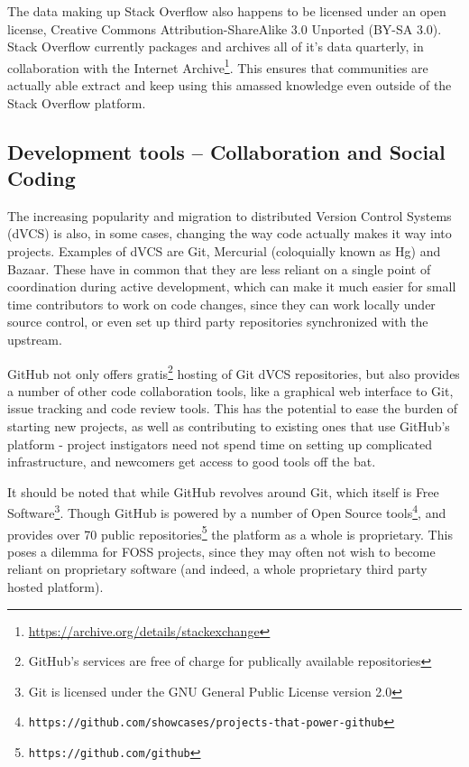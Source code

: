 \documentclass[a4paper,11pt]{article} %
\begin{document}
The data making up Stack Overflow also happens to be licensed under an open
license, Creative Commons Attribution-ShareAlike 3.0 Unported (BY-SA
3.0). Stack Overflow currently packages and archives all of it's data
quarterly, in collaboration with the Internet
Archive\footnote{\url{https://archive.org/details/stackexchange}}. This
ensures that communities are actually able extract and keep using this
amassed knowledge even outside of the Stack Overflow platform.


\subsection{Development tools -- Collaboration and Social Coding}

The increasing popularity and migration to distributed Version Control
Systems (dVCS) is also, in some cases, changing the way code actually makes
it way into projects. Examples of dVCS are Git, Mercurial (coloquially known
as Hg) and Bazaar. These have in common that they are less reliant on a
single point of coordination during active development, which can make it
much easier for small time contributors to work on code changes, since they
can work locally under source control, or even set up third party
repositories synchronized with the upstream.

GitHub not only offers gratis\footnote{GitHub's services are free of charge
  for publically available repositories} hosting of Git dVCS repositories,
but also provides a number of other code collaboration tools, like a
graphical web interface to Git, issue tracking and code review tools. This
has the potential to ease the burden of starting new projects, as well as
contributing to existing ones that use GitHub's platform - project
instigators need not spend time on setting up complicated infrastructure,
and newcomers get access to good tools off the bat.

It should be noted that while GitHub revolves around Git, which itself is
Free Software\footnote{Git is licensed under the GNU General Public License
  version 2.0}. Though GitHub is powered by a number of Open Source
tools\footnote{\texttt{https://github.com/showcases/projects-that-power-github}},
and provides over \num{70} public
repositories\footnote{\texttt{https://github.com/github}} the platform as a
whole is proprietary. This poses a dilemma for FOSS projects, since they may
often not wish to become reliant on proprietary software (and indeed, a
whole proprietary third party hosted platform).
\end{document}

